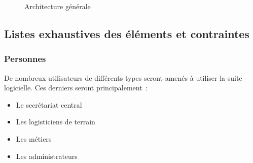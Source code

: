 \begin{figure}[htbp]
	\caption{Architecture générale}
	\label{Architecture générale}
\end{figure}

\subsection{Listes exhaustives des éléments et contraintes}

\subsubsection{Personnes}
De nombreux utilisateurs de différents types seront amenés à utiliser la suite logicielle. Ces derniers seront principalement~:
\begin{itemize}
	\item Le secrétariat central
	\item Les logisticiens de terrain
	\item Les métiers
	\item Les administrateurs
\end{itemize}

